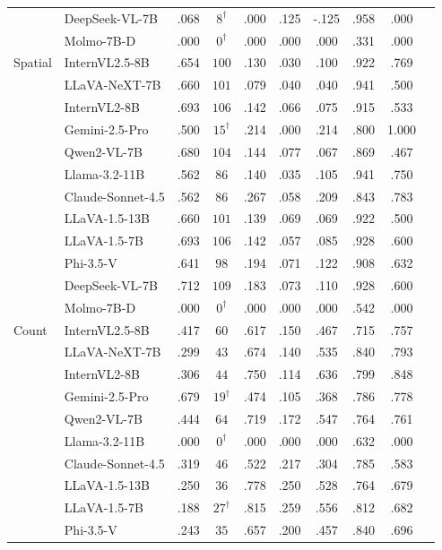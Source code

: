 \begin{tabular}{@{}llcccccccc@{}}
 & DeepSeek-VL-7B & .068 & $8^\dagger$ & .000 & .125 & -.125 & .958 & .000 \\
 & Molmo-7B-D & .000 & $0^\dagger$ & .000 & .000 & .000 & .331 & .000 \\
\midrule
Spatial & InternVL2.5-8B & .654 & $100$ & .130 & .030 & .100 & .922 & .769 \\
 & LLaVA-NeXT-7B & .660 & $101$ & .079 & .040 & .040 & .941 & .500 \\
 & InternVL2-8B & .693 & $106$ & .142 & .066 & .075 & .915 & .533 \\
 & Gemini-2.5-Pro & .500 & $15^\dagger$ & .214 & .000 & .214 & .800 & 1.000 \\
 & Qwen2-VL-7B & .680 & $104$ & .144 & .077 & .067 & .869 & .467 \\
 & Llama-3.2-11B & .562 & $86$ & .140 & .035 & .105 & .941 & .750 \\
 & Claude-Sonnet-4.5 & .562 & $86$ & .267 & .058 & .209 & .843 & .783 \\
 & LLaVA-1.5-13B & .660 & $101$ & .139 & .069 & .069 & .922 & .500 \\
 & LLaVA-1.5-7B & .693 & $106$ & .142 & .057 & .085 & .928 & .600 \\
 & Phi-3.5-V & .641 & $98$ & .194 & .071 & .122 & .908 & .632 \\
 & DeepSeek-VL-7B & .712 & $109$ & .183 & .073 & .110 & .928 & .600 \\
 & Molmo-7B-D & .000 & $0^\dagger$ & .000 & .000 & .000 & .542 & .000 \\
\midrule
Count & InternVL2.5-8B & .417 & $60$ & .617 & .150 & .467 & .715 & .757 \\
 & LLaVA-NeXT-7B & .299 & $43$ & .674 & .140 & .535 & .840 & .793 \\
 & InternVL2-8B & .306 & $44$ & .750 & .114 & .636 & .799 & .848 \\
 & Gemini-2.5-Pro & .679 & $19^\dagger$ & .474 & .105 & .368 & .786 & .778 \\
 & Qwen2-VL-7B & .444 & $64$ & .719 & .172 & .547 & .764 & .761 \\
 & Llama-3.2-11B & .000 & $0^\dagger$ & .000 & .000 & .000 & .632 & .000 \\
 & Claude-Sonnet-4.5 & .319 & $46$ & .522 & .217 & .304 & .785 & .583 \\
 & LLaVA-1.5-13B & .250 & $36$ & .778 & .250 & .528 & .764 & .679 \\
 & LLaVA-1.5-7B & .188 & $27^\dagger$ & .815 & .259 & .556 & .812 & .682 \\
 & Phi-3.5-V & .243 & $35$ & .657 & .200 & .457 & .840 & .696 \\

\end{tabular}
